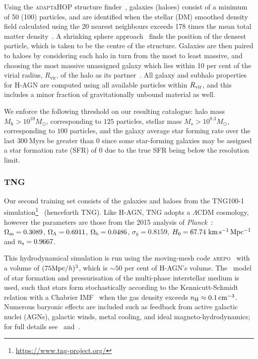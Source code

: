 \documentclass[usenatbib,useAMS]{mnras}
\begin{document}
Using the \textsc{adaptaHOP} structure finder~\citep{Aubert_2004,Tweed_2009}, galaxies (haloes) consist of a minimum of 50 (100) particles, and are identified when the stellar (\ac{DM}) smoothed density field calculated using the 20 nearest neighbours exceeds 178 times the mean total matter density~\citep{Gunn_1972}. A shrinking sphere approach~\citep{Power_2003} finds the position of the densest particle, which is taken to be the centre of the structure. Galaxies are then paired to haloes by considering each halo in turn from the most to least massive, and choosing the most massive unassigned galaxy which lies within 10 per cent of the virial radius, $R_\mathrm{vir}$, of the halo as its partner~\citep{Chisari_2017,Bartlett_OffsetBH_2021}. All galaxy and subhalo properties for H-AGN are computed using all available particles within $R_{\rm vir}$, and this includes a minor fraction of gravitationally unbound material as well.

We enforce the following threshold on our resulting catalogue: halo mass $M_\mathrm{h} > 10^{10} M_\odot$, corresponding to $125$ particles, stellar mass $M_\star > 10^{8.3} M_\odot$, corresponding to $100$ particles, and the galaxy average star forming rate over the last $300~\mathrm{Myrs}$ be greater than $0$ since some star-forming galaxies may be assigned a star formation rate (SFR) of $0$ due to the true SFR being below the resolution limit.

\subsubsection{TNG}\label{sec:TNG-100}

Our second training set consists of the galaxies and haloes from the TNG100-1 simulation\footnote{\url{https://www.tng-project.org/}}~\citep{Marinacci_2018,Naiman_2018,Nelson_2018,Pillepich_2018_results,Springel_2018} (henceforth TNG). Like H-AGN, TNG adopts a $\Lambda$CDM cosmology, however the parameters are those from the 2015 analysis of \textit{Planck}~\citep{Planck_Parameters_2016}: $\Omega_{\rm m} = 0.3089$, $\Omega_{\rm \Lambda}=0.6911$, $\Omega_{\rm b}=0.0486$, $\sigma_8=0.8159$, $H_0 = 67.74 \, {\rm \, km \, s^{-1} \, Mpc^{-1}}$ and $n_{\rm s} = 0.9667$.

This hydrodynamical simulation is run using the moving-mesh code \textsc{arepo}~\citep{Springel_2010} with a volume of $(75 {\rm Mpc}/h)^3$, which is $\sim50$ per cent of H-AGN's volume. The~\citet{Springel_2003} model of star formation and pressurisation of the multi-phase interstellar medium is used, such that stars form stochastically according to the Kennicutt-Schmidt relation with a Chabrier IMF~\citep{Chabrier_2003} when the gas density exceeds $n_{\rm H} \approx 0.1 {\rm \, cm^{-3}}$. Numerous baryonic effects are included such as feedback from active galactic nuclei (AGNs), galactic winds, metal cooling, and ideal magneto-hydrodynamics; for full details see~\citet{Weinberger_2017} and~\citet{Pillepich_2018_methods}.
\end{document}

